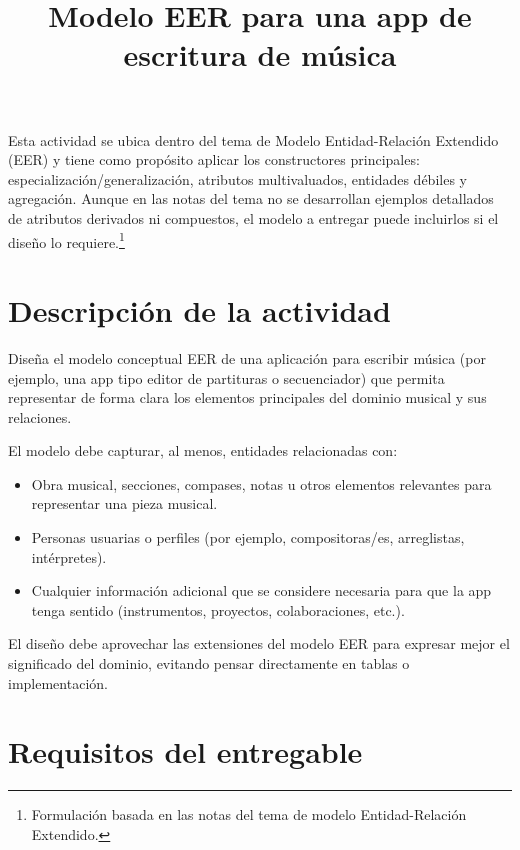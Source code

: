 \documentclass[12pt]{article}
\title{Modelo EER para una app de escritura de música}
\author{}
\date{}
\begin{document}
	
	\maketitle
	
	Esta actividad se ubica dentro del tema de Modelo Entidad-Relación Extendido (EER) y tiene como propósito aplicar los constructores principales: especialización/generalización, atributos multivaluados, entidades débiles y agregación. Aunque en las notas del tema no se desarrollan ejemplos detallados de atributos derivados ni compuestos, el modelo a entregar puede incluirlos si el diseño lo requiere.\footnote{Formulación basada en las notas del tema de modelo Entidad-Relación Extendido.}
	
	\section*{Descripción de la actividad}
	
	Diseña el modelo conceptual EER de una aplicación para escribir música (por ejemplo, una app tipo editor de partituras o secuenciador) que permita representar de forma clara los elementos principales del dominio musical y sus relaciones.
	
	El modelo debe capturar, al menos, entidades relacionadas con:
	\begin{itemize}
		\item Obra musical, secciones, compases, notas u otros elementos relevantes para representar una pieza musical.
		\item Personas usuarias o perfiles (por ejemplo, compositoras/es, arreglistas, intérpretes).
		\item Cualquier información adicional que se considere necesaria para que la app tenga sentido (instrumentos, proyectos, colaboraciones, etc.).
	\end{itemize}
	
	El diseño debe aprovechar las extensiones del modelo EER para expresar mejor el significado del dominio, evitando pensar directamente en tablas o implementación.
	
	\section*{Requisitos del entregable}
	
\end{document}
